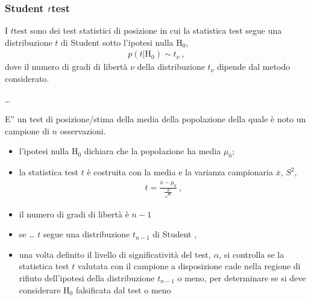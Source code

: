 \documentclass[letterpaper,10pt,italian]{jupyterBook}
\begin{document}
\subsubsection{Student \protect\(t\protect\)\sphinxhyphen{}test}
\label{\detokenize{ch/statistics/hp-test-single:student-t-test}}
\sphinxAtStartPar
I \(t\)\sphinxhyphen{}test sono dei test statistici di posizione in cui la statistica test segue una distribuzione \(t\) di Student sotto l’ipotesi nulla \(\text{H}_0\),
\begin{equation*}
\begin{split}p(t|\text{H}_0) \sim t_{\nu} \ ,\end{split}
\end{equation*}
\sphinxAtStartPar
dove il numero di gradi di libertà \(\nu\) della distribuzione \(t_{\nu}\) dipende dal metodo considerato.

\sphinxAtStartPar
{} …

\sphinxAtStartPar
{} E” un test di posizione/stima della media della popolazione della quale è noto un campione di \(n\) osservazioni.
\begin{itemize}
\item {} 
\sphinxAtStartPar
l’ipotesi nulla \(\text{H}_0\) dichiara che la popolazione ha media \(\mu_0\);

\item {} 
\sphinxAtStartPar
la statistica test \(t\) è costruita con la media e la varianza campionaria \(\overline{x}\), \(S^2\),
\begin{equation*}
\begin{split}t = \frac{\overline{x} - \mu_0}{\frac{S}{\sqrt{n}}} \ ,\end{split}
\end{equation*}
\item {} 
\sphinxAtStartPar
il numero di gradi di libertà è \(n-1\) 

\item {} 
\sphinxAtStartPar
{} se … \(t\) segue una distribuzione \(t_{n-1}\) di Student  , 

\item {} 
\sphinxAtStartPar
una volta definito il livello di significatività del test, \(\alpha\), si controlla se la statistica test \(t\) valutata con il campione a disposizione cade nella regione di rifiuto dell’ipotesi della distribuzione \(t_{n-1}\) o meno, per determinare se si deve considerare \(\text{H}_0\) falsificata dal test o meno

\end{itemize}
\end{document}
